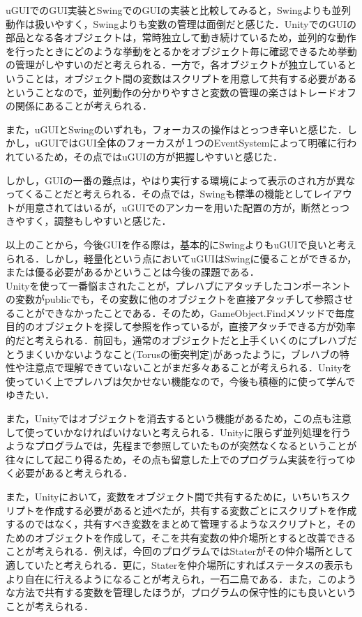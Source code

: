 \documentclass[12pt]{jarticle}
\begin{document}
uGUIでのGUI実装とSwingでのGUIの実装と比較してみると，Swingよりも並列動作は扱いやすく，Swingよりも変数の管理は面倒だと感じた．UnityでのGUIの部品となる各オブジェクトは，常時独立して動き続けているため，並列的な動作を行ったときにどのような挙動をとるかをオブジェクト毎に確認できるため挙動の管理がしやすいのだと考えられる．一方で，各オブジェクトが独立しているということは，オブジェクト間の変数はスクリプトを用意して共有する必要があるということなので，並列動作の分かりやすさと変数の管理の楽さはトレードオフの関係にあることが考えられる．

また，uGUIとSwingのいずれも，フォーカスの操作はとっつき辛いと感じた．しかし，uGUIではGUI全体のフォーカスが１つのEventSystemによって明確に行われているため，その点ではuGUIの方が把握しやすいと感じた．

しかし，GUIの一番の難点は，やはり実行する環境によって表示のされ方が異なってくることだと考えられる．その点では，Swingも標準の機能としてレイアウトが用意されてはいるが，uGUIでのアンカーを用いた配置の方が，断然とっつきやすく，調整もしやすいと感じた．

以上のことから，今後GUIを作る際は，基本的にSwingよりもuGUIで良いと考えられる．しかし，軽量化という点においてuGUIはSwingに優ることができるか，または優る必要があるかということは今後の課題である． \\

Unityを使って一番悩まされたことが，プレハブにアタッチしたコンポーネントの変数がpublicでも，その変数に他のオブジェクトを直接アタッチして参照させることができなかったことである．そのため，GameObject.Findメソッドで毎度目的のオブジェクトを探して参照を作っているが，直接アタッチできる方が効率的だと考えられる．前回も，通常のオブジェクトだと上手くいくのにプレハブだとうまくいかないようなこと(Torusの衝突判定)があったように，ブレハブの特性や注意点で理解できていないことがまだ多々あることが考えられる．Unityを使っていく上でプレハブは欠かせない機能なので，今後も積極的に使って学んでゆきたい．

また，Unityではオブジェクトを消去するという機能があるため，この点も注意して使っていかなければいけないと考えられる．Unityに限らず並列処理を行うようなプログラムでは，先程まで参照していたものが突然なくなるということが往々にして起こり得るため，その点も留意した上でのプログラム実装を行ってゆく必要があると考えられる．

また，Unityにおいて，変数をオブジェクト間で共有するために，いちいちスクリプトを作成する必要があると述べたが，共有する変数ごとにスクリプトを作成するのではなく，共有すべき変数をまとめて管理するようなスクリプトと，そのためのオブジェクトを作成して，そこを共有変数の仲介場所とすると改善できることが考えられる．例えば，今回のプログラムではStaterがその仲介場所として適していたと考えられる．更に，Staterを仲介場所にすればステータスの表示もより自在に行えるようになることが考えられ，一石二鳥である．また，このような方法で共有する変数を管理したほうが，プログラムの保守性的にも良いということが考えられる． \\
\end{document}
